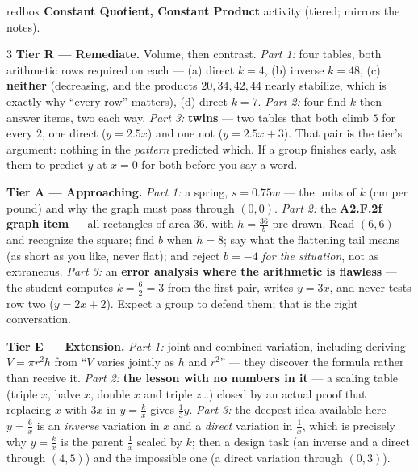 \documentclass[10pt]{article}
\begin{document}
\begin{skillbox}{redbox}
\textbf{Constant Quotient, Constant Product} activity (tiered; mirrors the notes).
\begin{multicols}{3}
\textbf{Tier R --- Remediate.} Volume, then contrast. \emph{Part 1:} four tables, both arithmetic rows
required on each --- (a) direct $k=4$, (b) inverse $k=48$, (c) \textbf{neither} (decreasing, and the
products $20,34,42,44$ nearly stabilize, which is exactly why ``every row'' matters), (d) direct $k=7$.
\emph{Part 2:} four find-$k$-then-answer items, two each way. \emph{Part 3:} \textbf{twins} --- two
tables that both climb $5$ for every $2$, one direct ($y=2.5x$) and one not ($y=2.5x+3$). That pair is
the tier's argument: nothing in the \emph{pattern} predicted which. If a group finishes early, ask them
to predict $y$ at $x=0$ for both before you say a word.

\columnbreak
\textbf{Tier A --- Approaching.} \emph{Part 1:} a spring, $s=0.75w$ --- the units of $k$ (cm per pound)
and why the graph must pass through $(0,0)$. \emph{Part 2:} the \textbf{A2.F.2f graph item} --- all
rectangles of area $36$, with $h=\frac{36}{b}$ pre-drawn. Read $(6,6)$ and recognize the square; find
$b$ when $h=8$; say what the flattening tail means (as short as you like, never flat); and reject
$b=-4$ \emph{for the situation}, not as extraneous. \emph{Part 3:} an \textbf{error analysis where the
arithmetic is flawless} --- the student computes $k=\frac62=3$ from the first pair, writes $y=3x$, and
never tests row two ($y=2x+2$). Expect a group to defend them; that is the right conversation.

\columnbreak
\textbf{Tier E --- Extension.} \emph{Part 1:} joint and combined variation, including deriving
$V=\pi r^2h$ from ``$V$ varies jointly as $h$ and $r^2$'' --- they discover the formula rather than
receive it. \emph{Part 2:} \textbf{the lesson with no numbers in it} --- a scaling table (triple $x$,
halve $x$, double $x$ and triple $z$\dots) closed by an actual proof that replacing $x$ with $3x$ in
$y=\frac kx$ gives $\frac13 y$. \emph{Part 3:} the deepest idea available here --- $y=\frac6x$ is an
\emph{inverse} variation in $x$ and a \emph{direct} variation in $\frac1x$, which is precisely why
$y=\frac kx$ is the parent $\frac1x$ scaled by $k$; then a design task (an inverse and a direct through
$(4,5)$) and the impossible one (a direct variation through $(0,3)$).
\end{multicols}
\end{skillbox}
\end{document}
